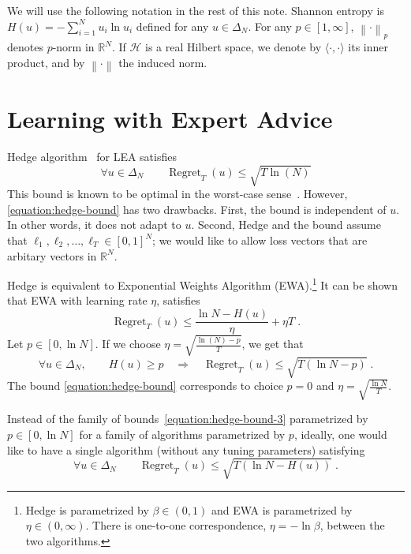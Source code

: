 \documentclass{colt2016} %
\DeclareMathOperator{\Regret}{Regret}
\newcommand{\R}{\mathbb{R}}     %
\renewcommand{\H}{\mathcal{H}}  %
\newcommand{\norm}[1]{\left\|{#1}\right\|}
\begin{document}
We will use the following notation in the rest of this note. Shannon entropy
is $H(u) = -\sum_{i=1}^N u_i \ln u_i$ defined for any $u \in \Delta_N$. For any
$p \in [1,\infty]$, $\norm{\cdot}_p$ denotes $p$-norm in $\R^N$. If $\H$ is a
real Hilbert space, we denote by $\langle \cdot, \cdot \rangle$ its inner
product, and by $\norm{\cdot}$ the induced norm.

\section{Learning with Expert Advice}

Hedge algorithm~\citep{Freund-Schapire-1997} for LEA satisfies
\begin{equation}
\label{equation:hedge-bound}
\forall u \in \Delta_N \qquad \Regret_T(u) \le \sqrt{T \ln(N)}
\end{equation}
This bound is known to be optimal in the worst-case sense~\cite[Section
3.7]{Cesa-Bianchi-Lugosi-2006}. However, \eqref{equation:hedge-bound} has two
drawbacks.  First, the bound is independent of $u$. In other words, it does not
adapt to $u$.  Second, Hedge and the bound assume that $\ell_1, \ell_2, \dots,
\ell_T \in [0,1]^N$; we would like to allow loss vectors that are arbitary
vectors in $\R^N$.

Hedge is equivalent to Exponential Weights Algorithm (EWA).\footnote{Hedge is parametrized by $\beta \in (0,1)$ and EWA is parametrized by $\eta \in (0, \infty)$.
There is one-to-one correspondence, $\eta = - \ln \beta$, between the two algorithms.}
It can be shown that EWA with learning rate $\eta$, satisfies
\begin{equation}
\label{equation:hedge-bound-2}
\Regret_T(u) \le \frac{\ln N - H(u)}{\eta} + \eta T \; .
\end{equation}
Let $p \in [0, \ln N]$. If we choose $\eta = \sqrt{\frac{\ln(N) - p}{T}}$, we get that
\begin{equation}
\label{equation:hedge-bound-3}
\forall u \in \Delta_N, \qquad H(u) \ge p \quad \Longrightarrow \quad \Regret_T(u) \le \sqrt{T (\ln N - p)} \; .
\end{equation}
The bound \eqref{equation:hedge-bound} corresponds to choice $p=0$ and
$\eta=\sqrt{\frac{\ln N}{T}}$.

Instead of the family of bounds~\eqref{equation:hedge-bound-3} parametrized by
$p \in [0, \ln N]$ for a family of algorithms parametrized by $p$,
ideally, one would like to have a single algorithm (without any
tuning parameters) satisfying
\begin{equation}
\label{equation:parameter-free-bound-experts}
\forall u \in \Delta_N \qquad \Regret_T(u) \le \sqrt{T (\ln N - H(u))} \; .
\end{equation}
\end{document}

